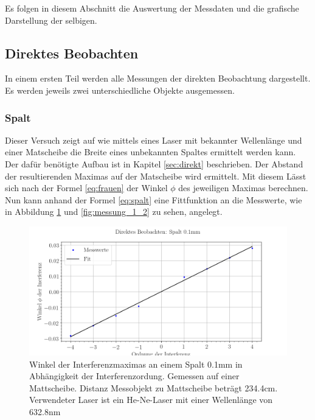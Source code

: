 Es folgen in diesem Abschnitt die Auswertung der Messdaten und die grafische Darstellung der selbigen.

\subsection{Direktes Beobachten}
In einem ersten Teil werden alle Messungen der direkten Beobachtung dargestellt. Es werden jeweils zwei unterschiedliche Objekte ausgemessen.

\subsubsection{Spalt}

Dieser Versuch zeigt auf wie mittels eines Laser mit bekannter Wellenlänge und einer Matscheibe die Breite eines unbekannten Spaltes ermittelt werden kann. Der dafür benötigte Aufbau ist in Kapitel \ref{sec:direkt} beschrieben. Der Abstand der resultierenden Maximas auf der Matscheibe wird ermittelt. Mit diesem Lässt sich nach der Formel \ref{eq:frauen} der Winkel $\phi$ des jeweiligen Maximas berechnen. Nun kann anhand der Formel \ref{eq:spalt} eine Fittfunktion an die Messwerte, wie in Abbildung \ref{fig:messung_1_1} und \ref{fig:messung_1_2} zu sehen, angelegt.

\begin{figure}[htb]
\includegraphics[width=\textwidth]{graphics/messung_1_1.png}
\caption{Winkel der Interferenzmaximas an einem Spalt 0.1mm in Abhängigkeit der Interferenzordung. Gemessen auf einer Mattscheibe. Distanz Messobjekt zu Mattscheibe beträgt 234.4cm. Verwendeter Laser ist ein He-Ne-Laser mit einer Wellenlänge von 632.8nm} %
\label{fig:messung_1_1}
\end{figure}

